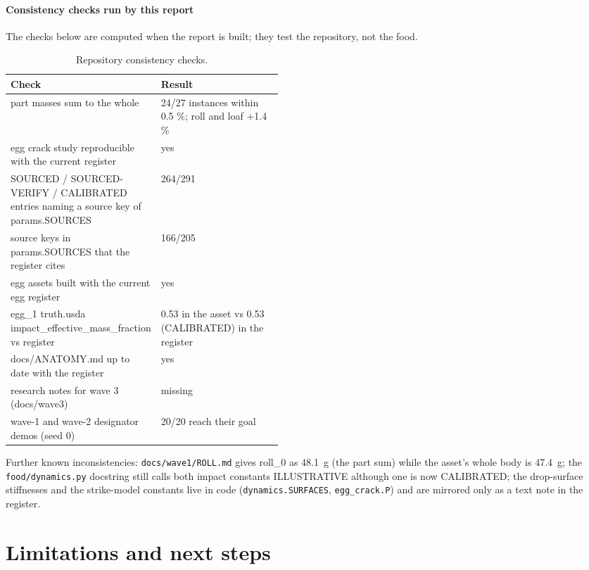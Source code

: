 \documentclass[10.5pt,a4paper]{article}
\begin{document}
\paragraph{Consistency checks run by this report} The checks below are computed when the report is built;
they test the repository, not the food.
\begin{table}[htbp]\centering\footnotesize\caption{Repository consistency checks.}
\begin{tabularx}{\linewidth}{@{}Xp{0.45\linewidth}@{}}\toprule Check & Result \\\midrule
part masses sum to the whole & 24/27 instances within 0.5 \%; roll and loaf +1.4 \% \\
egg crack study reproducible with the current register & yes \\
SOURCED / SOURCED-VERIFY / CALIBRATED entries naming a source key of params.SOURCES & 264/291 \\
source keys in params.SOURCES that the register cites & 166/205 \\
egg assets built with the current egg register & yes \\
egg\_1 truth.usda impact\_effective\_mass\_fraction vs register & 0.53 in the asset vs 0.53 (CALIBRATED) in the register \\
docs/ANATOMY.md up to date with the register & yes \\
research notes for wave 3 (docs/wave3) & missing \\
wave-1 and wave-2 designator demos (seed 0) & 20/20 reach their goal \\\bottomrule\end{tabularx}\end{table}
Further known inconsistencies: \texttt{docs/wave1/ROLL.md} gives roll\_0 as 48.1~g (the part sum) while the
asset's whole body is 47.4~g; the \texttt{food/dynamics.py} docstring still calls both impact constants ILLUSTRATIVE
although one is now CALIBRATED; the drop-surface stiffnesses and the strike-model constants live in code
(\texttt{dynamics.SURFACES}, \texttt{egg\_crack.P}) and are mirrored only as a text note in the register.
\section{Limitations and next steps}\label{sec:next}
\end{document}
